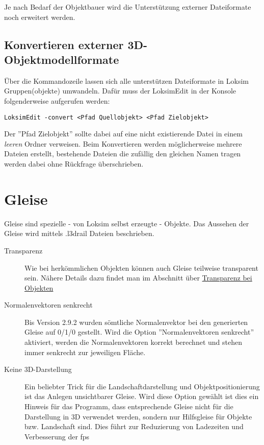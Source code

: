 Je nach Bedarf der Objektbauer wird die Unterstützung externer Dateiformate noch erweitert werden.

\subsection{Konvertieren externer 3D-Objektmodellformate}
\label{sec:editor-obj-externe-konvertieren}
Über die Kommandozeile lassen sich alle unterstützen Dateiformate in Loksim Gruppen(objekte) umwandeln. Dafür muss der LoksimEdit in der Konsole folgenderweise aufgerufen werden:
\begin{verbatim}
LoksimEdit -convert <Pfad Quellobjekt> <Pfad Zielobjekt>
\end{verbatim}
Der ''Pfad Zielobjekt'' sollte dabei auf eine nicht existierende Datei in einem \emph{leeren} Ordner verweisen. Beim Konvertieren werden möglicherweise mehrere Dateien erstellt, bestehende Dateien die zufällig den gleichen Namen tragen werden dabei ohne Rückfrage überschrieben.

\section{Gleise}
\label{sec:editor-gleise}
Gleise sind spezielle - von Loksim selbst erzeugte - Objekte. Das Aussehen der Gleise wird mittels .l3drail Dateien beschrieben.

\begin{description}
\item[Transparenz] Wie bei herkömmlichen Objekten können auch Gleise teilweise transparent sein. Nähere Details dazu findet man im Abschnitt über \hyperref[sec:editor-obj-transparenz]{Transparenz bei Objekten}
\item[Normalenvektoren senkrecht] Bis Version 2.9.2 wurden sömtliche Normalenvektor bei den generierten Gleise auf 0/1/0 gestellt. Wird die Option ''Normalenvektoren senkrecht'' aktiviert, werden die Normalenvektoren korrekt berechnet und stehen immer senkrecht zur jeweiligen Fläche.
\item[Keine 3D-Darstellung] Ein beliebter Trick für die Landschaftdarstellung und Objektpositionierung ist das Anlegen unsichtbarer Gleise. Wird diese Option gewählt ist dies ein Hinweis für das Programm, dass entsprechende Gleise nicht für die Darstellung in 3D verwendet werden, sondern nur Hilfsgleise für Objekte bzw. Landschaft sind. Dies führt zur Reduzierung von Ladezeiten und Verbesserung der fps
\end{description}
